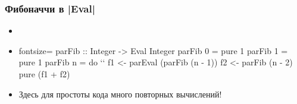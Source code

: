 \documentclass[11pt]{beamer}
\begin{document}
\begin{frame}[fragile]
\frametitle{Фибоначчи в \haskinline|Eval|}
\begin{itemize}
    \item 
    \pause
    \item 
\begin{haskell*}{fontsize=\footnotesize}
    parFib :: Integer -> Eval Integer
    parFib 0 = pure 1
    parFib 1 = pure 1
    parFib n = do `\pause`
      f1 <- parEval (parFib (n - 1))
      f2 <- parFib (n - 2)
      pure (f1 + f2)
\end{haskell*}
\pause
\item Здесь для простоты кода много повторных вычислений!
\end{itemize}
\end{frame}

\end{document}
